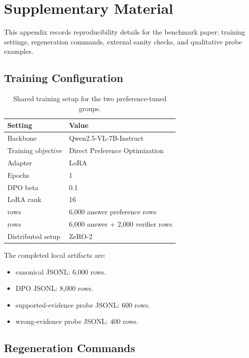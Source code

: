 \section{Supplementary Material}

This appendix records reproducibility details for the \benchmark{} benchmark
paper: training settings, regeneration commands, external sanity checks, and
qualitative probe examples.

\subsection{Training Configuration}

\begin{table}[ht]
\centering
\footnotesize
\begin{tabular}{ll}
\toprule
Setting & Value \\
\midrule
Backbone & Qwen2.5-VL-7B-Instruct \\
Training objective & Direct Preference Optimization \\
Adapter & LoRA \\
Epochs & 1 \\
DPO beta & 0.1 \\
LoRA rank & 16 \\
\answerdpo{} rows & 6{,}000 answer preference rows \\
\cepodual{} rows & 6{,}000 answer + 2{,}000 verifier rows \\
Distributed setup & ZeRO-2 \\
\bottomrule
\end{tabular}
\caption{Shared training setup for the two preference-tuned groups.}
\label{tab:app_train}
\end{table}

The completed local artifacts are:
\begin{itemize}
    \item canonical \dataset{} JSONL: 6{,}000 rows.
    \item \cepodual{} DPO JSONL: 8{,}000 rows.
    \item supported-evidence probe JSONL: 600 rows.
    \item wrong-evidence probe JSONL: 400 rows.
\end{itemize}

\subsection{Regeneration Commands}

